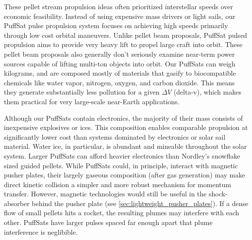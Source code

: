 \documentclass{article}
\begin{document}
These pellet stream propulsion ideas often prioritized interstellar speeds over economic feasibility.  Instead of using expensive mass drivers or light sails, our PuffSat pulse propulsion system focuses on achieving high speeds primarily through low cost orbital maneuvers.  Unlike pellet beam proposals, PuffSat pulsed propulsion aims to  provide very heavy lift to propel large craft into orbit.  These pellet beam proposals also generally don't seriously examine near-term power sources capable of lifting multi-ton objects into orbit. Our PuffSats can weigh kilograms, and are composed mostly of materials that gasify to biocompatible chemicals like water vapor, nitrogen, oxygen, and carbon dioxide.   This means they generate substantially less pollution for a given $\Delta V$ (delta-v), which makes them practical for very large-scale near-Earth applications.  

Although our PuffSats contain electronics, the majority of their mass consists of inexpensive explosives or ices. This composition enables comparable propulsion at significantly lower cost than systems dominated by electronics or solar sail material. Water ice, in particular, is abundant and mineable throughout the solar system.  Larger PuffSats can afford heavier electronics than Nordley's snowflake sized guided pellets.  While PuffSats could, in principle, interact with magnetic pusher plates, their largely gaseous composition (after gas generation) may make direct kinetic collision a simpler and more robust mechanism for momentum transfer.  However, magnetic technologies would still be useful in the shock-absorber behind the pusher plate (see \autoref{sec:lightweight_pusher_plates}).  If a dense flow of small pellets hits a rocket, the resulting plumes may interfere with each other.   PuffSats have larger pulses spaced far enough apart that plume interference is neglibible.
\end{document}

